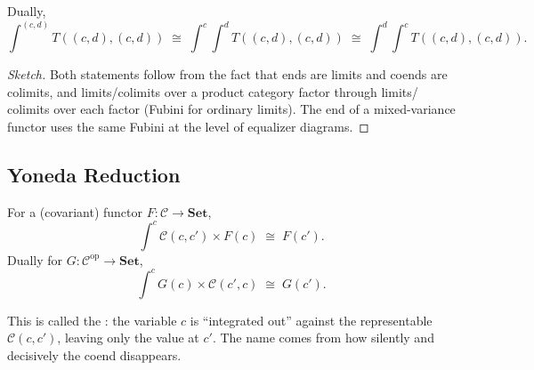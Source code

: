 \begin{theorem}
\label{thm:fubini-coend}
Dually,
\begin{equation*}
  \int^{(c, d)} T((c, d), (c, d))
  \;\cong\;
  \int^c \int^d T((c, d), (c, d))
  \;\cong\;
  \int^d \int^c T((c, d), (c, d)).
\end{equation*}
\end{theorem}

\begin{proof}[Sketch]
Both statements follow from the fact that ends are limits and coends are
colimits, and limits/colimits over a product category factor through limits/
colimits over each factor (Fubini for ordinary limits). The end of a
mixed-variance functor uses the same Fubini at the level of equalizer
diagrams.
\end{proof}

\subsection{Yoneda Reduction}

\begin{theorem}
\label{thm:yoneda-reduction-coend}
For a (covariant) functor $F : \mathcal{C} \to \mathbf{Set}$,
\begin{equation*}
  \int^c \mathcal{C}(c, c') \times F(c) \;\cong\; F(c').
\end{equation*}
Dually for $G : \mathcal{C}^{\mathrm{op}} \to \mathbf{Set}$,
\begin{equation*}
  \int^c G(c) \times \mathcal{C}(c', c) \;\cong\; G(c').
\end{equation*}
\end{theorem}

\begin{howtosay}
This is called the : the variable $c$ is
``integrated out'' against the representable $\mathcal{C}(c, c')$, leaving
only the value at $c'$. The name comes from how silently and decisively the
coend disappears.
\end{howtosay}

